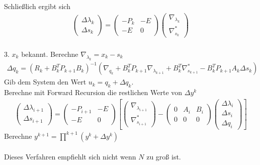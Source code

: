 \documentclass[12pt,a4paper]{article}
\begin{document}
  Schließlich ergibt sich
  \begin{align*}
  \begin{pmatrix}
  \Delta \lambda_{k} \\
  \Delta s_{k}
  \end{pmatrix} =
  \begin{pmatrix}
  -P_k & -E \\
  -E  & 0 
  \end{pmatrix}
  \begin{pmatrix}
  \nabla_{\lambda_{k}} \\
  \nabla_{s_{k}}^{*}
  \end{pmatrix}
  \end{align*} \\
  3. $x_k$ bekannt. Berechne $\nabla_{\lambda_{k}}=x_k -s_k $
  \begin{align*}
  \Delta q_{k} =
  (R_{k}+B_{k}^{T}P_{k+1} B_{k})^{-1}
  (\nabla_{q_{k}}+ B_{k}^{T}P_{k+1} \nabla_{\lambda_{k+1}} +
  B_{k}^{T}\nabla_{s_{k+1}}^{*} -B_{k}^{T}P_{k+1} A_{k} \Delta s_{k})  
  \end{align*}
  Gib dem System den Wert $u_k = q_k + \Delta q_k $.\\
  Berechne mit Forward Recursion die restlichen Werte von $\Delta y^{k}$
  \begin{align*}
  \begin{pmatrix}
  \Delta \lambda_{i+1} \\
  \Delta s_{i+1}
  \end{pmatrix} =
  \begin{pmatrix}
  -P_{i+1} & -E \\
  -E  & 0 
  \end{pmatrix}
  \left[ 
  \begin{pmatrix}
  \nabla_{\lambda_{i+1}} \\
  \nabla_{s_{i+1}}^{*}
  \end{pmatrix} -
  \begin{pmatrix}
  0 & A_i & B_i \\
  0 & 0 & 0 
  \end{pmatrix}
  \begin{pmatrix}
  \Delta \lambda_{i} \\
  \Delta s_{i} \\
  \Delta q_{i}
  \end{pmatrix} \right] 
  \end{align*}
  Berechne $ y^{k+1} = \prod ^{k+1}(y^{k} + \Delta y^{k})$ \\
  \\
  Dieses Verfahren empfiehlt sich nicht wenn $ N $ zu groß ist.\\
\end{document}

